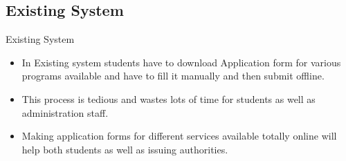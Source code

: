 \documentclass [] {beamer}
\begin{document}
\subsection{Existing System}

\begin{frame}{Existing System}   
\begin{itemize}
    \item In Existing system students have to download Application form for various programs available and have to fill it manually and then submit offline.
    \item  This process is tedious and wastes lots of time for students as well as administration staff.
    \item Making application forms for different services available totally online will help both students as well as issuing authorities.
\end{itemize}
\end{frame}
\end{document}
